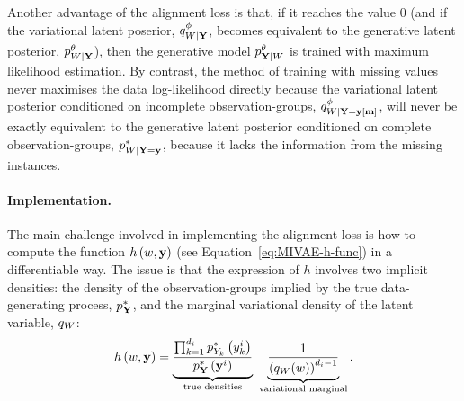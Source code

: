 \documentclass[../thesis.tex]{subfiles}
\begin{document}
Another advantage of the alignment loss is that, if it reaches the value 0 (and if the variational latent poserior, $\myfunc{q}^{\phi}_{\myrv{w} | \mygroup{\myrv{y}}}$, becomes equivalent to the generative latent posterior, $\myfunc{p}^{\theta}_{\myrv{w} | \mygroup{\myrv{y}}}$), then the generative model $\myfunc{p}^{\theta}_{\mygroup{\myrv{y}} | \myrv{w}}$ is trained with maximum likelihood estimation. By contrast, the method of training with missing values never maximises the data log-likelihood directly because the variational latent posterior conditioned on incomplete observation-groups, $\myfunc{q}^{\phi}_{\myrv{w} | \mygroup{\myrv{y}} = \mygroup{\myvect{y}} \left[ \mygroup{\myvect{m}} \right]}$, will never be exactly equivalent to the generative latent posterior conditioned on complete observation-groups, $\myfunc{p}^{*}_{\myrv{w} | \mygroup{\myrv{y}} = \mygroup{\myvect{y}}}$, because it lacks the information from the missing instances. 

\paragraph{Implementation.} The main challenge involved in implementing the alignment loss is how to compute the function $h \left( w, \mathbf{{y}} \right)$ (see Equation~\ref{eq:MIVAE-h-func}) in a differentiable way. The issue is that the expression of $h$ involves two implicit densities: the density of the observation-groups implied by the true data-generating process, $\myfunc{p}^{*}_{\mygroup{\myrv{y}}}$, and the marginal variational density of the latent variable, $\myfunc{q}_{\myrv{w}}$: 
\[
    \myfunc{h} \left( \myvect{w}, \mygroup{\myvect{y}} \right) = \underbrace{\frac{\prod_{k=1}^{\mycnt{d}_i} \myfunc{p}^{*}_{\myrv{y}_k} \left( \myvect{y}^i_k \right)}{\myfunc{p}^{*}_{\mygroup{\myrv{y}}} \left( \mygroup{\myvect{y}}^i \right)}}_{\text{true densities}} ~ \underbrace{\frac{1}{\left( \myfunc{q}_{\myrv{w}} (\myvect{w}) \right)^{\mycnt{d}_i - 1}}}_{\text{variational marginal}}.
\]
\end{document}
